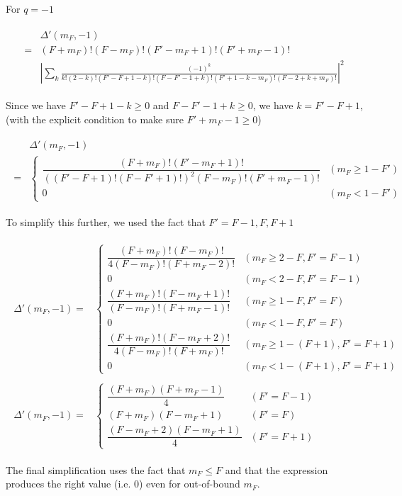 \documentclass[10pt,fleqn]{article}
\newcommand{\eqar}[1]
{
  \begin{align}
    #1
  \end{align}
}
\newcommand{\paren}[1]{{\left({#1}\right)}}
\newcommand{\abs}[1]{{\left|{#1}\right|}}
\begin{document}
For $q=-1$
\eqar{
  \begin{split}
    &\Delta'(m_F,-1)\\
    =&(F+m_F)!(F-m_F)!(F'-m_F+1)!(F'+m_F-1)!\\
    &\abs{\sum_{k}\frac{(-1)^k}{k!(2\!-\!k)!(F'\!-\!F\!+\!1\!-\!k)!(F\!-\!F'\!-\!1\!+\!k)!(F'\!+\!1\!-\!k\!-\!m_F)!(F\!-\!2\!+\!k\!+\!m_F)!}}^2
  \end{split}
}
Since we have $F'\!-\!F\!+\!1\!-\!k\geqslant0$ and $F\!-\!F'\!-\!1\!+\!k\geqslant0$, we have $k=F'-F+1$, (with the explicit condition to make sure $F'+m_F-1\geqslant0$)
\eqar{
  \begin{split}
    &\Delta'(m_F,-1)\\
    =&\begin{cases}
      \dfrac{(F+m_F)!(F'-m_F+1)!}{\paren{(F'-F+1)!(F-F'+1)!}^2(F-m_F)!(F'+m_F-1)!}&(m_F\geqslant1-F')\\
      0&(m_F<1-F')
    \end{cases}
  \end{split}
}
To simplify this further, we used the fact that $F'=F-1,F,F+1$
\eqar{
  \begin{split}
    \Delta'(m_F,-1)=&\begin{cases}
      \dfrac{(F+m_F)!(F-m_F)!}{4(F-m_F)!(F+m_F-2)!}&(m_F\geqslant2-F,F'=F-1)\\
      0&(m_F<2-F,F'=F-1)\\
      \dfrac{(F+m_F)!(F-m_F+1)!}{(F-m_F)!(F+m_F-1)!}&(m_F\geqslant1-F,F'=F)\\
      0&(m_F<1-F,F'=F)\\
      \dfrac{(F+m_F)!(F-m_F+2)!}{4(F-m_F)!(F+m_F)!}&(m_F\geqslant1-(F+1),F'=F+1)\\
      0&(m_F<1-(F+1),F'=F+1)
    \end{cases}
  \end{split}\\
  \begin{split}
    \Delta'(m_F,-1)=&\begin{cases}
      \dfrac{(F+m_F)(F+m_F-1)}{4}&(F'=F-1)\\
      (F+m_F)(F-m_F+1)&(F'=F)\\
      \dfrac{(F-m_F+2)(F-m_F+1)}{4}&(F'=F+1)
    \end{cases}
  \end{split}
}
The final simplification uses the fact that $m_F\leqslant F$
and that the expression produces the right value (i.e. $0$) even for out-of-bound $m_F$.
\end{document}
